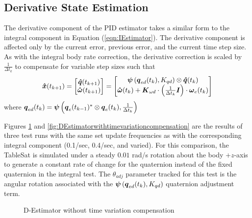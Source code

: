 \subsection{Derivative State Estimation}
\label{subsec:DerivativeEstimator}

The derivative component of the PID estimator takes a similar form to the integral component in Equation (\ref{eqn:IEstimator}).  The derivative component is affected only by the current error, previous error, and the current time step size.  As with the integral body rate correction, the derivative correction is scaled by $\frac{1}{\Delta t_k}$ to compensate for variable step sizes such that
\begin{equation}
  \begin{aligned}
    \boldsymbol{\hat{x}}(t_{k+1}) &= \begin{bmatrix} \boldsymbol{\hat{q}}(t_{k+1}) \\ \boldsymbol{\hat{\omega}}(t_{k+1}) \end{bmatrix} =
    \begin{bmatrix} \boldsymbol{\psi}\left(\boldsymbol{q}_{ed}(t_k), K_{qd}\right) \otimes \boldsymbol{\hat{q}}(t_{k}) \\
     \boldsymbol{\hat{\omega}}(t_{k}) + \boldsymbol{K}_{\omega d} \cdot \left(\frac{1}{\Delta t_k} \boldsymbol{I}\right) \cdot \boldsymbol{\omega}_e(t_{k}) \end{bmatrix} \\
  \end{aligned}
  \label{eqn:DEstimator}
\end{equation}
where $\boldsymbol{q}_{ed}(t_k) = \boldsymbol{\psi}\left(\boldsymbol{q}_e(t_{k-1})^* \otimes \boldsymbol{q}_e(t_{k}), \frac{1}{\Delta t_{k}}\right)$

Figures \ref{fig:DEstimatorwithouttimevariationcompensation} and \ref{fig:DEstimatorwithtimevariationcompensation} are the results of three test runs with the same set update frequencies as with the corresponding integral component (0.1/sec, 0.4/sec, and varied).  For this comparison, the TableSat is simulated under a steady $0.01$ rad/s rotation about the body $+z$-axis to generate a constant rate of change for the quaternion instead of the fixed quaternion in the integral test.  The $\theta_{adj}$ parameter tracked for this test is the angular rotation associated with the $\boldsymbol{\psi}\left(\boldsymbol{q}_{ed}(t_k), K_{qd}\right)$ quaternion adjustment term.

\begin{figure}[H]
  \centerline{}
  \caption{D-Estimator without time variation compensation}
  \label{fig:DEstimatorwithouttimevariationcompensation}
\end{figure}

